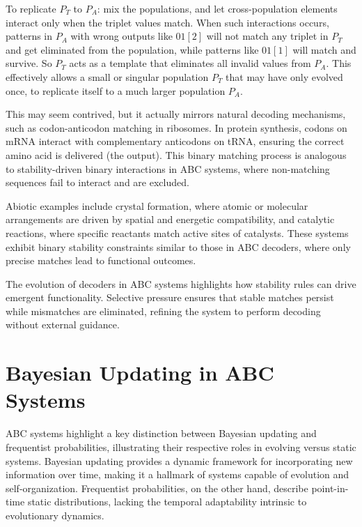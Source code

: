 \documentclass[entropy,article,submit,pdftex,moreauthors]{Definitions/mdpi}
\begin{document}
 To replicate \( P_T \) to \( P_A \): mix the populations, and let cross-population elements interact only when the triplet values match. When such interactions occurs, patterns in \( P_A \) with wrong outputs like \(01[2]\) will not match any triplet in \( P_T \) and get eliminated from the population, while patterns like \(01[1]\) will match and survive. So \( P_T \) acts as a template that eliminates all invalid values from \( P_A \). This effectively allows a small or singular population \( P_T \) that may have only evolved once, to replicate itself to a much larger population \( P_A \).

This may seem contrived, but it actually mirrors natural decoding mechanisms, such as codon-anticodon matching in ribosomes. In protein synthesis, codons on mRNA interact with complementary anticodons on tRNA, ensuring the correct amino acid is delivered (the output). This binary matching process is analogous to stability-driven binary interactions in ABC systems, where non-matching sequences fail to interact and are excluded.

Abiotic examples include crystal formation, where atomic or molecular arrangements are driven by spatial and energetic compatibility, and catalytic reactions, where specific reactants match active sites of catalysts. These systems exhibit binary stability constraints similar to those in ABC decoders, where only precise matches lead to functional outcomes.

The evolution of decoders in ABC systems highlights how stability rules can drive emergent functionality. Selective pressure ensures that stable matches persist while mismatches are eliminated, refining the system to perform decoding without external guidance.

\section{Bayesian Updating in ABC Systems}

ABC systems highlight a key distinction between Bayesian \cite{mcgrayne2011theory} updating and frequentist probabilities, illustrating their respective roles in evolving versus static systems. Bayesian updating provides a dynamic framework for incorporating new information over time, making it a hallmark of systems capable of evolution and self-organization. Frequentist probabilities, on the other hand, describe point-in-time static distributions, lacking the temporal adaptability intrinsic to evolutionary dynamics.
\end{document}
